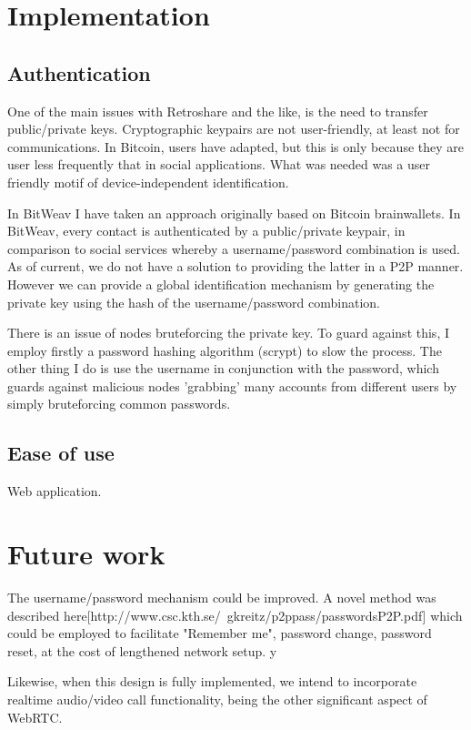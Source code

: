\documentclass[10pt,a4paper,onecolumn]{article}
\begin{document}
\section{Implementation}
\subsection{Authentication}
One of the main issues with Retroshare and the like, is the need to transfer public/private keys. Cryptographic keypairs are not user-friendly, at least not for communications. In Bitcoin, users have adapted, but this is only because they are user less frequently that in social applications. What was needed was a user friendly motif of device-independent identification. 

In BitWeav I have taken an approach originally based on Bitcoin brainwallets. In BitWeav, every contact is authenticated by a public/private keypair, in comparison to social services whereby a username/password combination is used. As of current, we do not have a solution to providing the latter in a P2P manner. However we can provide a global identification mechanism by generating the private key using the hash of the username/password combination. 

There is an issue of nodes bruteforcing the private key. To guard against this, I employ firstly a password hashing algorithm (scrypt) to slow the process. The other thing I do is use the username in conjunction with the password, which guards against malicious nodes 'grabbing' many accounts from different users by simply bruteforcing common passwords. 

\subsection{Ease of use}
Web application.

\section{Future work}
The username/password mechanism could be improved. A novel method was described here[http://www.csc.kth.se/~gkreitz/p2ppass/passwordsP2P.pdf] which could be employed to facilitate "Remember me", password change, password reset, at the cost of lengthened network setup. y

Likewise, when this design is fully implemented, we intend to incorporate realtime audio/video call functionality, being the other significant aspect of WebRTC.
\end{document}
